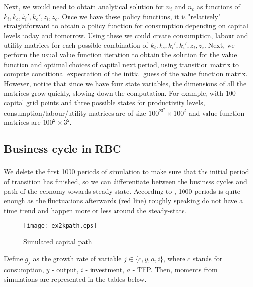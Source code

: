\documentclass[]{article}
\begin{document}
Next, we would need to obtain analytical solution for $n_i$ and $n_c$ as functions of $k_i, k_c, k_i', k_c', z_i, z_c$. Once we have these policy functions, it is "relatively" straightforward to obtain a policy function for consumption depending on capital levels today and tomorrow. Using these we could create consumption, labour and utility matrices for each possible combination of $k_i, k_c, k_i', k_c', z_i, z_c$. Next, we perform the usual value function iteration to obtain the solution for the value function and optimal choices of capital next period, using transition matrix to compute conditional expectation of the initial guess of the value function matrix. However, notice that since we have four state variables, the dimensions of all the matrices grow quickly, slowing down the computation. For example, with 100 capital grid points and three possible states for productivity levels, consumption/labour/utility matrices are of size $100^23^2\times100^2$ and value function matrices are $100^2\times3^2$.

\subsection{Business cycle in RBC}

\subsubsection{}
We delete the first 1000 periods of simulation to make sure that the initial period of transition has finished, so we can differentiate between the business cycles and path of the economy towards steady state. According to , 1000 periods is quite enough as the fluctuations afterwards (red line) roughly speaking do not have a time trend and happen more or less around the steady-state.
\begin{figure}[h]
	\centering
	\texttt{[image: ex2kpath.eps]}
	\caption{Simulated capital path}
	\label{fig:ex2kpath}
\end{figure}

Define $g_j$ as the growth rate of variable $j\in\{c,y,a,i\}$, where $c$ stands for consumption, $y$ - output, $i$ - investment, $a$ - TFP. Then, moments from simulations are represented in the tables below.
\end{document}
